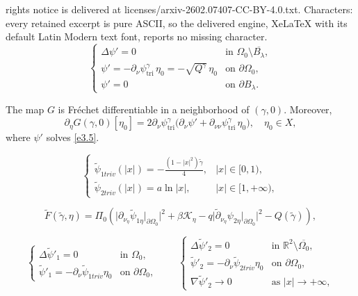 \documentclass[10pt,a4paper]{amsart}
\begin{document}
rights notice is delivered at licenses/arxiv-2602.07407-CC-BY-4.0.txt. Characters: every retained excerpt is pure ASCII, so the delivered engine, XeLaTeX with its default Latin Modern text font, reports no missing character.
\begin{equation}\label{e3.5}
\begin{cases}
\Delta \psi' = 0 & \text{in } \Omega_0 \setminus \overline{B_\lambda}, \\
\psi' = -\partial_\nu \psi^\gamma_\mathrm{tri} \, \eta_0 = -\sqrt{Q^\gamma} \, \eta_0 & \text{on } \partial \Omega_0, \\
\psi' = 0 & \text{on } \partial B_\lambda.
\end{cases}
\end{equation}

\begin{proposition}\label{pro-3.3}
The map \(G\) is Fr\'{e}chet differentiable in a neighborhood of \((\gamma, 0)\). Moreover,
\begin{equation}\label{e3.6}
\partial_\eta G(\gamma, 0)[\eta_0] = 2 \partial_\nu \psi^\gamma_\mathrm{tri} \bigl( \partial_\nu \psi' + \partial_{\nu\nu} \psi^\gamma_\mathrm{tri} \, \eta_0 \bigr), \quad \eta_0 \in X,
\end{equation}
where \(\psi'\) solves \eqref{e3.5}.
\end{proposition}

\begin{equation}\label{e5.3}
\begin{cases}
\widetilde{\psi}_{1triv}(|x|) = -\frac{\left(1-|x|^2\right)\widetilde{\gamma}}{4}, & |x| \in [0,1), \\
\widetilde{\psi}_{2triv}(|x|) = a\ln |x|, & |x| \in [1,+\infty),
\end{cases}
\end{equation}

\begin{equation}\label{e5.4}
\widetilde{F}(\widetilde{\gamma},\eta) =\Pi_0\left( \big| \partial_{\nu_\eta} \widetilde{\psi}_{1\eta}\big|_{\partial \Omega_0}\big|^2+\beta\mathcal{K}_{\eta}-q\big| \widetilde{\partial}_{\nu_\eta} \psi_{2\eta}\big|_{\partial \Omega_0}\big|^2-Q(\widetilde{\gamma})\right) ,
\end{equation}

\begin{equation}\label{e5.5}
\begin{cases}
\Delta \widetilde{\psi}'_{1} = 0 & \text{in } \Omega_0, \\
\widetilde{\psi}'_{1} = -\partial_{\nu}\widetilde{\psi}_{1triv} \eta_0 & \text{on } \partial \Omega_0,
\end{cases}
\qquad
\begin{cases}
\Delta \widetilde{\psi}'_{2} = 0 & \text{in } \mathbb{R}^2 \setminus \overline{\Omega_0}, \\
\widetilde{\psi}'_{2} = -\partial_{\nu}\widetilde{\psi}_{2triv} \eta_0 & \text{on } \partial \Omega_0, \\
\nabla\widetilde{\psi}'_{2} \rightarrow0 & \text{as } |x|\rightarrow +\infty,
\end{cases}
\end{equation}
\end{document}
